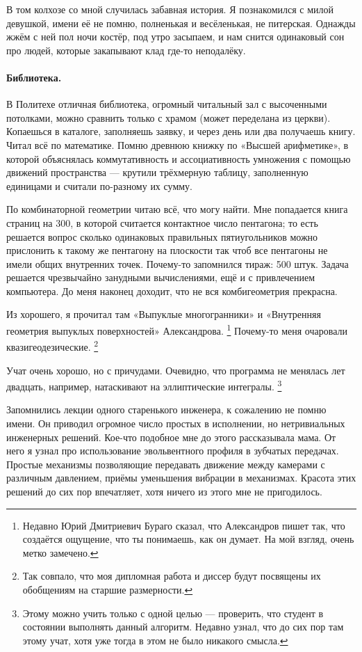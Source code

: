 \documentclass{book}
\begin{document}
В том колхозе со мной случилась забавная история. 
Я познакомился с милой девушкой, имени её не помню, полненькая и весёленькая, не питерская.
Однажды жжём с ней пол ночи костёр, 
под утро засыпаем, и нам снится одинаковый сон
про людей, которые закапывают клад где-то неподалёку.

\paragraph{Библиотека.}
В Политехе отличная библиотека, огромный читальный зал с высоченными потолками,
можно сравнить только с храмом (может переделана из церкви).
Копаешься в каталоге, заполняешь заявку, и через день или два получаешь книгу.
Читал всё по математике.
Помню древнюю книжку по «Высшей арифметике»,
в которой объяснялась коммутативность и ассоциативность умножения с помощью движений пространства --- крутили трёхмерную таблицу, заполненную единицами и считали по-разному их сумму.

По комбинаторной геометрии читаю всё, что могу найти.
Мне попадается книга страниц на 300,
в которой считается контактное число пентагона;
то есть решается вопрос сколько одинаковых правильных пятиугольников можно прислонить к такому же пентагону на плоскости так чтоб все пентагоны не имели общих внутренних точек.
Почему-то запомнился тираж: 500 штук.
Задача решается чрезвычайно занудными вычислениями, 
ещё и с привлечением компьютера.
До меня наконец доходит, что не вся комбигеометрия прекрасна.

Из хорошего, я прочитал там «Выпуклые многогранники» и «Внутренняя геометрия выпуклых поверхностей» Александрова.%
\footnote{Недавно Юрий Дмитриевич Бураго сказал, что Александров пишет так, что создаётся ощущение, что ты понимаешь, как он думает.
На мой взгляд, очень метко замечено.} 
Почему-то меня очаровали квазигеодезические.%
\footnote{Так совпало, что моя дипломная работа и диссер будут посвящены их обобщениям на старшие размерности.}


Учат очень хорошо, но с причудами.
Очевидно, что программа не менялась лет двадцать,
например, натаскивают на эллиптические интегралы.%
\footnote{Этому можно учить только с одной целью --- проверить, что студент в состоянии выполнять данный алгоритм.
Недавно узнал, что до сих пор там этому учат, хотя уже тогда в этом не было никакого смысла.}

Запомнились лекции одного старенького инженера, к сожалению не помню имени.
Он приводил огромное число простых в исполнении, но нетривиальных инженерных решений.
Кое-что подобное мне до этого рассказывала мама.
От него я узнал про использование эвольвентного профиля в зубчатых передачах.
Простые механизмы позволяющие передавать движение между камерами с различным давлением, приёмы уменьшения вибрации в механизмах.
Красота этих решений до сих пор впечатляет, хотя ничего из этого мне не пригодилось.
\end{document}
